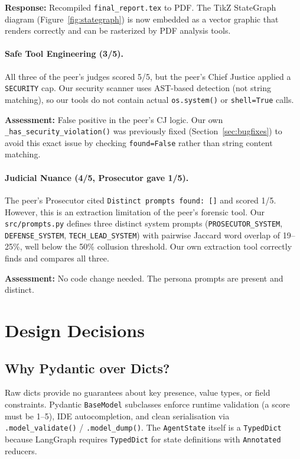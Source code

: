 \documentclass[11pt,a4paper]{article}
\begin{document}
\textbf{Response:} Recompiled \texttt{final\_report.tex} to PDF.
The TikZ StateGraph diagram (Figure~\ref{fig:stategraph}) is now embedded
as a vector graphic that renders correctly and can be rasterized by
PDF analysis tools.

\paragraph{Safe Tool Engineering (3/5).}
All three of the peer's judges scored 5/5, but the peer's Chief Justice
applied a \texttt{SECURITY} cap. Our security scanner uses AST-based
detection (not string matching), so our tools do not contain actual
\texttt{os.system()} or \texttt{shell=True} calls.

\textbf{Assessment:} False positive in the peer's CJ logic. Our own
\texttt{\_has\_security\_violation()} was previously fixed (Section~\ref{sec:bugfixes})
to avoid this exact issue by checking \texttt{found=False} rather than
string content matching.

\paragraph{Judicial Nuance (4/5, Prosecutor gave 1/5).}
The peer's Prosecutor cited \texttt{Distinct prompts found: []} and scored
1/5. However, this is an extraction limitation of the peer's forensic tool.
Our \texttt{src/prompts.py} defines three distinct system prompts
(\texttt{PROSECUTOR\_SYSTEM}, \texttt{DEFENSE\_SYSTEM}, \texttt{TECH\_LEAD\_SYSTEM})
with pairwise Jaccard word overlap of 19--25\%, well below the 50\% collusion
threshold. Our own extraction tool correctly finds and compares all three.

\textbf{Assessment:} No code change needed. The persona prompts are present
and distinct.

\section{Design Decisions}

\subsection{Why Pydantic over Dicts?}

Raw dicts provide no guarantees about key presence, value types, or field
constraints.  Pydantic \texttt{BaseModel} subclasses enforce runtime
validation (a score must be 1--5), IDE autocompletion, and clean
serialisation via \texttt{.model\_validate()} / \texttt{.model\_dump()}.
The \texttt{AgentState} itself is a \texttt{TypedDict} because LangGraph
requires \texttt{TypedDict} for state definitions with \texttt{Annotated}
reducers.
\end{document}
